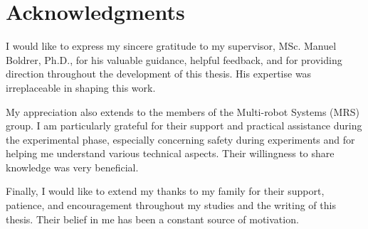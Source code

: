 
\section*{Acknowledgments}

I would like to express my sincere gratitude to my supervisor, MSc. Manuel Boldrer, Ph.D., for his valuable guidance, helpful feedback, and for providing direction throughout the development of this thesis. 
His expertise was irreplaceable in shaping this work.

My appreciation also extends to the members of the Multi-robot Systems (MRS) group. 
I am particularly grateful for their support and practical assistance during the experimental phase, especially concerning safety during experiments and for helping me understand various technical aspects. 
Their willingness to share knowledge was very beneficial.

Finally, I would like to extend my thanks to my family for their support, patience, and encouragement throughout my studies and the writing of this thesis. 
Their belief in me has been a constant source of motivation.

\vspace{2.5cm}
